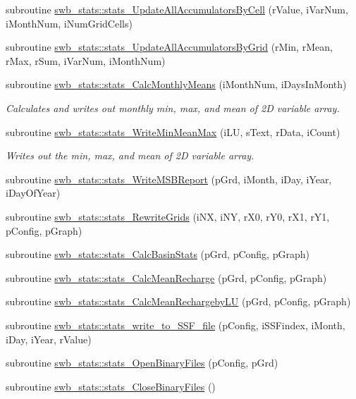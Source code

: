 \begin{DoxyCompactItemize}
subroutine \hyperlink{namespaceswb__stats_a6def08584e14bc099756846eab8c3fd0}{swb\_\-stats::stats\_\-UpdateAllAccumulatorsByCell} (rValue, iVarNum, iMonthNum, iNumGridCells)
\item 
subroutine \hyperlink{namespaceswb__stats_a35d0e8e9c65e260e0864eb01bffd2e56}{swb\_\-stats::stats\_\-UpdateAllAccumulatorsByGrid} (rMin, rMean, rMax, rSum, iVarNum, iMonthNum)
\item 
subroutine \hyperlink{namespaceswb__stats_a2a181014514f304c10a4823167eea79a}{swb\_\-stats::stats\_\-CalcMonthlyMeans} (iMonthNum, iDaysInMonth)
\begin{DoxyCompactList}\small\item\em Calculates and writes out monthly min, max, and mean of 2D variable array. \item\end{DoxyCompactList}\item 
subroutine \hyperlink{namespaceswb__stats_ae5f18911e97e0fc1ba46fc24975f03ed}{swb\_\-stats::stats\_\-WriteMinMeanMax} (iLU, sText, rData, iCount)
\begin{DoxyCompactList}\small\item\em Writes out the min, max, and mean of 2D variable array. \item\end{DoxyCompactList}\item 
subroutine \hyperlink{namespaceswb__stats_a477408383e1db8d73b78fabed1b1f805}{swb\_\-stats::stats\_\-WriteMSBReport} (pGrd, iMonth, iDay, iYear, iDayOfYear)
\item 
subroutine \hyperlink{namespaceswb__stats_a62541230c69c255a0beb7c13ea1fd262}{swb\_\-stats::stats\_\-RewriteGrids} (iNX, iNY, rX0, rY0, rX1, rY1, pConfig, pGraph)
\item 
subroutine \hyperlink{namespaceswb__stats_acd278076cc93c0919cda51b7188dab2e}{swb\_\-stats::stats\_\-CalcBasinStats} (pGrd, pConfig, pGraph)
\item 
subroutine \hyperlink{namespaceswb__stats_ad3c6cb80a9c1928e9235d16423bf48d8}{swb\_\-stats::stats\_\-CalcMeanRecharge} (pGrd, pConfig, pGraph)
\item 
subroutine \hyperlink{namespaceswb__stats_aaf222f82f042a1eeb3412be5e5bcd464}{swb\_\-stats::stats\_\-CalcMeanRechargebyLU} (pGrd, pConfig, pGraph)
\item 
subroutine \hyperlink{namespaceswb__stats_a148b78706f8169736ee3fa4a8289a319}{swb\_\-stats::stats\_\-write\_\-to\_\-SSF\_\-file} (pConfig, iSSFindex, iMonth, iDay, iYear, rValue)
\item 
subroutine \hyperlink{namespaceswb__stats_a59a2b9123745126691c28085080584ec}{swb\_\-stats::stats\_\-OpenBinaryFiles} (pConfig, pGrd)
\item 
subroutine \hyperlink{namespaceswb__stats_a841f19be673726e0d221293413ddcae4}{swb\_\-stats::stats\_\-CloseBinaryFiles} ()
\end{DoxyCompactItemize}
